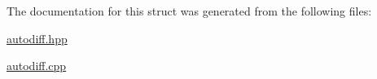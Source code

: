 The documentation for this struct was generated from the following files\-:\begin{DoxyCompactItemize}
\item 
\hyperlink{autodiff_8hpp}{autodiff.\-hpp}\item 
\hyperlink{autodiff_8cpp}{autodiff.\-cpp}\end{DoxyCompactItemize}
